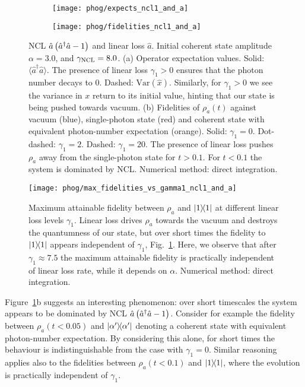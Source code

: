 \begin{figure}[htp]
\centering
	\begin{subfigure}{0.49\linewidth}
	\centering
	\texttt{[image: phog/expects\_ncl1\_and\_a]}
	\caption{}
	\end{subfigure}
	\begin{subfigure}{0.49\linewidth}
	\centering
	\texttt{[image: phog/fidelities\_ncl1\_and\_a]}
	\caption{}
	\end{subfigure}
\caption{\label{fig:phog_A_ncl_loss} NCL $\hat{a}\left(\hat{a}^\dagger \hat{a} - 1\right)$ and linear loss $\hat{a}$. Initial coherent state amplitude $\alpha=3.0$, and $\gamma_{\text{NCL}}=8.0$. (a) Operator expectation values. Solid: $\langle \hat{a}^\dagger \hat{a}\rangle$. The presence of linear loss $\gamma_1 > 0$ ensures that the photon number decays to $0$. Dashed: $\text{Var}\left(\hat{x}\right)$. Similarly, for $\gamma_1 > 0$ we see the variance in $x$ return to its initial value, hinting that our state is being pushed towards vacuum. (b) Fidelities of $\rho_a\left(t\right)$ against vacuum (blue), single-photon state (red) and coherent state with equivalent photon-number expectation (orange). Solid: $\gamma_1 = 0$. Dot-dashed: $\gamma_1 = 2$. Dashed: $\gamma_1 = 20$. The presence of linear loss pushes $\rho_a$ away from the single-photon state for $t > 0.1$. For $t < 0.1$ the system is dominated by NCL. Numerical method: direct integration.}
\end{figure}


\begin{figure}[htp]
\centering
\texttt{[image: phog/max\_fidelities\_vs\_gamma1\_ncl1\_and\_a]}
\caption{\label{fig:phog_max_fidelity} Maximum attainable fidelity between $\rho_a$ and $\dyad{1}$ at different linear loss levels $\gamma_1$. Linear loss drives $\rho_a$ towards the vacuum and destroys the quantumness of our state, but over short times the fidelity to $\dyad{1}$ appears independent of $\gamma_1$, Fig.~\ref{fig:phog_A_ncl_loss}. Here, we observe that after $\gamma_1 \approx 7.5$ the maximum attainable fidelity is practically independent of linear loss rate, while it depends on $\alpha$. Numerical method: direct integration.}
\end{figure}

Figure~\ref{fig:phog_A_ncl_loss}b suggests an interesting phenomenon: over short timescales the system appears to be dominated by NCL $\hat{a}\left(\hat{a}^\dagger \hat{a} - 1\right)$. Consider for example the fidelity between $\rho_a\left(t < 0.05\right)$ and $\dyad{\alpha^\prime}$ denoting a coherent state with equivalent photon-number expectation. By considering this alone, for short times the behaviour is indistinguishable from the case with $\gamma_1 = 0$. Similar reasoning applies also to the fidelities between $\rho_a\left(t < 0.1\right)$ and $\dyad{1}$, where the evolution is practically independent of $\gamma_1$.

